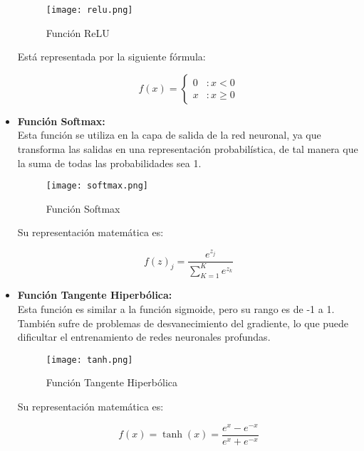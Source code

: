 \begin{itemize}
                \begin{figure}[H]
                    \centering
                    \texttt{[image: relu.png]}
                    \caption{Función ReLU}
                    \label{fig:relu_function}
                \end{figure}

                Está representada por la siguiente fórmula:

                \[
                f(x) = \left\{ \begin{array}{lr} 
                0 & : x < 0 \\
                x & : x \ge 0 
                \end{array} \right.
                \]
            
            \item \textbf{Función Softmax:} \\
                Esta función se utiliza en la capa de salida de la red neuronal, ya que transforma las salidas en una representación probabilística, de tal manera que la suma de todas las probabilidades sea 1.
                \begin{figure}[H]
                    \centering
                    \texttt{[image: softmax.png]}
                    \caption{Función Softmax}
                    \label{fig:softmax_function}
                \end{figure}

                Su representación matemática es:

                \[
                f(z)_j = \frac{e^{z_j}}{\sum_{K=1}^{K} e^{z_k}}
                \]
            
            \item \textbf{Función Tangente Hiperbólica:} \\
                Esta función es similar a la función sigmoide, pero su rango es de -1 a 1. También sufre de problemas de desvanecimiento del gradiente, lo que puede dificultar el entrenamiento de redes neuronales profundas.

                \begin{figure}[H]
                    \centering
                    \texttt{[image: tanh.png]}
                    \caption{Función Tangente Hiperbólica}
                    \label{fig:tanh_function}
                \end{figure}

                Su representación matemática es:

                \[
                f(x) = \tanh(x) = \frac{e^x - e^{-x}}{e^x + e^{-x}}
                \]
        
        \end{itemize}
        
